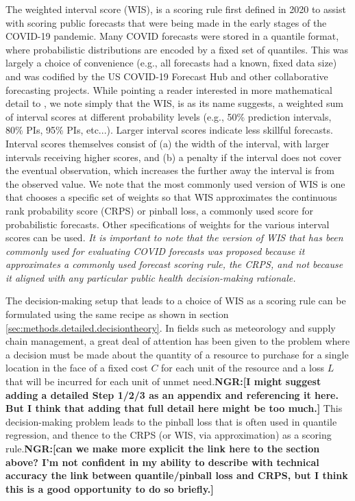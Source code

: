 \documentclass{article}\usepackage[]{graphicx}\usepackage[]{xcolor}
\def\ngr#1{{\color{blue}\textbf{NGR:[#1]}}}
\begin{document}
The weighted interval score (WIS), is a scoring rule first defined in 2020 to assist with scoring public forecasts that were being made in the early stages of the COVID-19 pandemic.\citep{bracher2021evaluating}
Many COVID forecasts were stored in a quantile format, where probabilistic distributions are encoded by a fixed set of quantiles.
This was largely a choice of convenience (e.g., all forecasts had a known, fixed data size) and was codified by the US COVID-19 Forecast Hub and other collaborative forecasting projects.\citep{cramer_united_2022}
While pointing a reader interested in more mathematical detail to \cite{bracher2021evaluating}, we note simply that the WIS, is as its name suggests, a weighted sum of interval scores at different probability levels (e.g., 50\% prediction intervals, 80\% PIs, 95\% PIs, etc...).
Larger interval scores indicate less skillful forecasts.
Interval scores themselves consist of (a) the width of the interval, with larger intervals receiving higher scores, and (b) a penalty if the interval does not cover the eventual observation, which increases the further away the interval is from the observed value.
We note that the most commonly used version of WIS is one that chooses a specific set of weights so that WIS approximates the continuous rank probability score (CRPS) or pinball loss, a commonly used score for probabilistic forecasts.
Other specifications of weights for the various interval scores can be used.
\emph{It is important to note that the version of WIS that has been commonly used for evaluating COVID forecasts was proposed because it approximates a commonly used forecast scoring rule, the CRPS, and not because it aligned with any particular public health decision-making rationale.}

The decision-making setup that leads to a choice of WIS as a scoring rule can be formulated using the same recipe as shown in section \ref{sec:methods.detailed.decisiontheory}. In fields such as meteorology and supply chain management, a great deal of attention has been given to the problem where a decision must be made about the quantity of a resource to purchase for a single location in the face of a fixed cost $C$ for each unit of the resource and a loss $L$ that will be incurred for each unit of unmet need.\ngr{I might suggest adding a detailed Step 1/2/3 as an appendix and referencing it here. But I think that adding that full detail here might be too much.} This decision-making problem leads to the pinball loss that is often used in quantile regression, and thence to the CRPS (or WIS, via approximation) as a scoring rule.\ngr{can we make more explicit the link here to the section above? I'm not confident in my ability to describe with technical accuracy the link between quantile/pinball loss and CRPS, but I think this is a good opportunity to do so briefly.}
\end{document}
